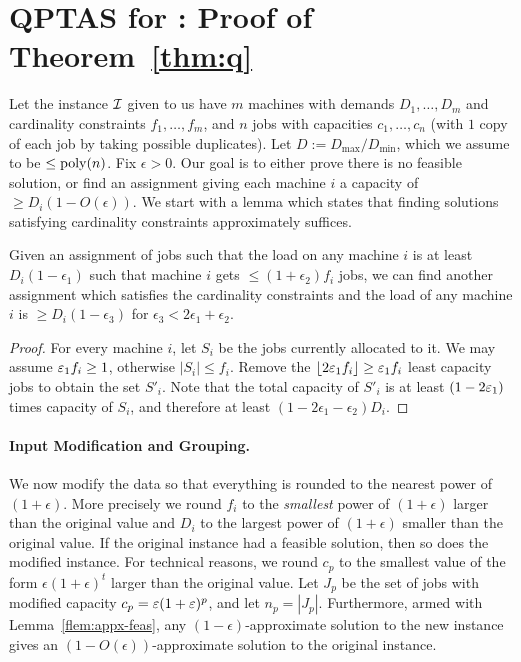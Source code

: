 \section{QPTAS for \cckp: Proof of Theorem~\ref{thm:q}}
\def\pv{\mathbf{b}}
\renewcommand{\dem}{\mathsf{cap}}
Let the instance ${\cal I}$ given to us have $m$ machines with demands $D_1,\ldots,D_m$ and cardinality constraints $f_1,\ldots,f_m$, and $n$ jobs with capacities
$c_1,\ldots,c_n$ (with $1$ copy of each job by taking possible duplicates). Let $D:= D_\mathrm{max}/D_\mathrm{min}$, which we assume to be $\leq \mathrm{poly}(n)$.
Fix $\epsilon> 0$. Our goal is to either prove there is no feasible solution, or find an assignment
giving each machine $i$ a capacity of $\geq D_i(1-O(\epsilon))$.
We start with a lemma which states that finding solutions satisfying cardinality constraints approximately suffices.
\begin{lemma}\label{flem:appx-feas}
	Given an assignment of jobs such that the load on any machine $i$  is at least $D_i(1 - \epsilon_1)$ such that machine $i$ gets $\leq (1+\epsilon_2)f_i$ jobs,
	we can find another assignment which satisfies the cardinality constraints and the load of any machine $i$ is $\geq D_i(1 - \epsilon_3)$ for $\epsilon_3 < 2\epsilon_1+\epsilon_2$.
\end{lemma}
\begin{proof}
For every machine $i$, let $S_i$ be the jobs currently allocated to it. We may assume $\varepsilon_1 f_i \geq 1$, otherwise $|S_i| \leq f_i$.
Remove the $\lfloor2\varepsilon_1 f_i\rfloor \geq \varepsilon_1 f_i$ least capacity jobs to obtain the set $S'_i$. Note that the total capacity of $S'_i$ is at least $(1-2\varepsilon_1)$ times capacity of $S_i$, and therefore
at least $(1-2\epsilon_1 - \epsilon_2)D_i$.
\end{proof}
\noindent
\paragraph{Input Modification and Grouping.}
We now modify the data so that everything is rounded to the nearest power of $(1+\epsilon)$. More precisely we round  $f_i$  to the {\em smallest} power of $(1+\epsilon)$ larger than the original value and $D_i$ to the largest power of $(1+\epsilon)$ smaller than the original value.
If the original instance had a feasible solution, then so does the modified instance.
For technical reasons, we round $c_p$ to the smallest value of the form $\epsilon(1+\epsilon)^t$ larger than the original value.
Let $J_p$ be the set of jobs with modified capacity $c_p = \varepsilon (1+\varepsilon)^p$, and let $n_p = |J_p|$. Furthermore, armed with Lemma~\ref{flem:appx-feas}, any $(1-\epsilon)$-approximate solution to the new instance gives an $(1-O(\epsilon))$-approximate solution to the original instance.  \smallskip


